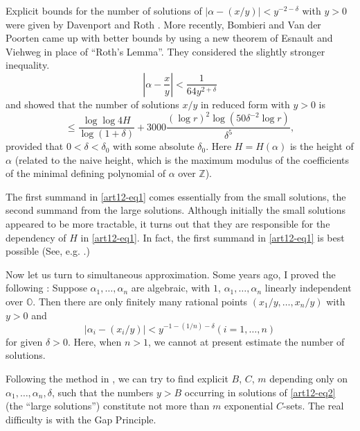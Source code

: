 Explicit bounds for the number of solutions of $|\alpha-(x/y)|<y^{-2-\delta}$ with $y>0$ were given by Davenport and Roth \cite{art12-key3}. More recently, Bombieri and Van der Poorten \cite{art12-key2} came up with better bounds by using a new theorem of Esnault and Viehweg \cite{art12-key4} in place of ``Roth's Lemma''. They considered the slightly stronger inequality.
$$
\left|\alpha-\frac{x}{y}\right|<\frac{1}{64y^{2+\delta}}
$$
and showed that the number of solutions $x/y$ in reduced form with $y>0$ is 
\begin{equation}
\leq \frac{\log\log 4H}{\log (1+\delta)}+3000\frac{(\log r)^{2}\log(50\delta^{-2}\log r)}{\delta^{5}},\label{art12-eq1}
\end{equation}\pageoriginale 
provided that $0<\delta<\delta_{0}$ with some absolute $\delta_{0}$. Here $H=H(\alpha)$ is the height of $\alpha$ (related to the naive height, which is the maximum modulus of the coefficients of the minimal defining polynomial of $\alpha$ over $\mathbb{Z}$).

The first summand in \eqref{art12-eq1} comes essentially from the small solutions, the second summand from the large solutions. Although initially the small solutions appeared to be more tractable, it turns out that they are responsible for the dependency of $H$ in \eqref{art12-eq1}. In fact, the first summand in \eqref{art12-eq1} is best possible (See, e.g. \cite{art12-key8}.)

Now let us turn to simultaneous approximation. Some years ago, I proved the following \cite{art12-key9} : Suppose $\alpha_{1},\ldots,\alpha_{n}$ are algebraic, with $1$, $\alpha_{1},\ldots,\alpha_{n}$ linearly independent over $\mathbb{O}$. Then there are only finitely many rational points $(x_{1}/y,\ldots,x_{n}/y)$ with $y>0$ and
\begin{equation}
|\alpha_{i}-(x_{i}/y)|<y^{-1-(1/n)-\delta}(i=1,\ldots,n)\label{art12-eq2}
\end{equation}
for given $\delta>0$. Here, when $n>1$, we cannot at present estimate the number of solutions.

Following the method in \cite{art12-key11}, we can try to find explicit $B$, $C$, $m$ depending only on $\alpha_{1},\ldots,\alpha_{n},\delta$, such that the numbers $y>B$ occurring in solutions of \eqref{art12-eq2} (the ``large solutions'') constitute not more than $m$ exponential $C$-sets. The real difficulty is with the Gap Principle.

